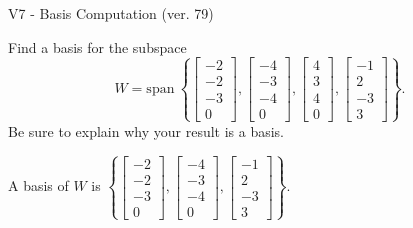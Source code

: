 \begin{exercise}
  \begin{exerciseTitle}V7 - Basis Computation (ver. 79)\end{exerciseTitle}
  \begin{exerciseStatement}
    Find a basis for the subspace 
\[W=\mathrm{span}\ \left\{\left[\begin{array}{r}
-2 \\
-2 \\
-3 \\
0
\end{array}\right] , \left[\begin{array}{r}
-4 \\
-3 \\
-4 \\
0
\end{array}\right] , \left[\begin{array}{r}
4 \\
3 \\
4 \\
0
\end{array}\right] , \left[\begin{array}{r}
-1 \\
2 \\
-3 \\
3
\end{array}\right]\right\}.\]
 Be sure to explain why your result is a basis.


  \end{exerciseStatement}
  \begin{exerciseAnswer}
   A basis of \(W\) is  \(\left\{\left[\begin{array}{r}
-2 \\
-2 \\
-3 \\
0
\end{array}\right] , \left[\begin{array}{r}
-4 \\
-3 \\
-4 \\
0
\end{array}\right] , \left[\begin{array}{r}
-1 \\
2 \\
-3 \\
3
\end{array}\right]\right\}\).
  


  \end{exerciseAnswer}
\end{exercise}